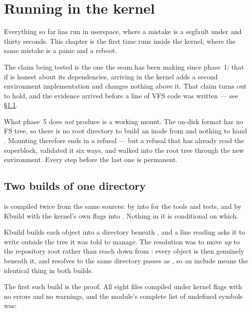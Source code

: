 \chapter{Running in the kernel}
\label{ch:kernel}

Everything so far has run in userspace, where a mistake is a segfault under
 and thirty seconds. This chapter is the first time  runs
inside the kernel, where the same mistake is a panic and a reboot.

The claim being tested is the one the seam has been making since phase~1: that
if  is honest about its dependencies, arriving in the kernel adds a
second environment implementation and changes nothing above it. That claim
turns out to hold, and the evidence arrived before a line of VFS code was
written --- see \S\ref{sec:kernel-buildproof}.

What phase~5 does \emph{not} produce is a working mount. The on-disk format has
no FS tree, so there is no root directory to build an inode from and nothing to
hand . Mounting therefore ends in a refusal --- but a
refusal that has already read the superblock, validated it six ways, and walked
into the root tree through the new environment. Every step before the last one
is permanent.

\section{Two builds of one directory}
\label{sec:kernel-buildproof}

 is compiled twice from the same sources: by 
into  for the tools and tests, and by Kbuild with the
kernel's own flags into . Nothing in it is conditional on
which.

Kbuild builds each object into a directory beneath , and a line
reading  asks it to write outside the tree
it was told to manage. The resolution was to move  \emph{up} to the
repository root rather than reach down from : every object is
then genuinely beneath it, and  resolves to the same directory
 passes as , so an include means the
identical thing in both builds.

The first such build is the proof. All eight  files compiled under
kernel flags with no errors and no warnings, and the module's complete list of
undefined symbols was:

